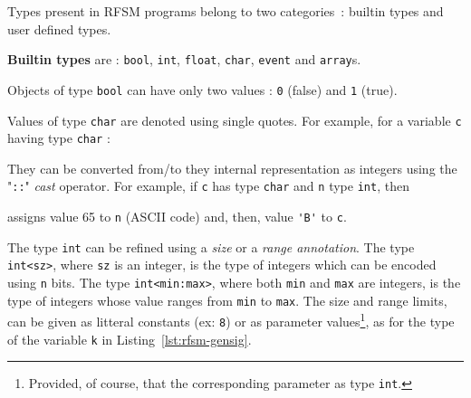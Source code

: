 Types present in RFSM programs belong to two categories~: builtin types and user defined types.

\medskip
\textbf{Builtin types} are : \texttt{bool}, \texttt{int}, \texttt{float}, \texttt{char}, \texttt{event} and
\texttt{array}s.

\step Objects of type \texttt{bool} can have only two values : \texttt{0} (false) and \texttt{1} (true).

\step Values of type \texttt{char} are
denoted using single quotes. For example, for a variable \verb|c| having type \verb|char| :
\begin{center}
\end{center}
They can be converted from/to they internal representation as integers using the "\verb|::|" \emph{cast}
operator. For example, if \verb|c| has type \verb|char| and \verb|n| type \verb|int|, then 
\begin{center}
\end{center}
assigns value 65 to \verb|n| (ASCII code) and, then, value \verb|'B'| to \verb|c|.


\step The type \texttt{int} can be refined using a \emph{size} or a \emph{range annotation}. The
type \verb|int<sz>|, where \verb|sz| is an integer, is the type of integers which can be encoded using
\verb|n| bits. The type \verb|int<min:max>|, where both \verb|min| and \verb|max| are integers, is
the type of integers whose value ranges from \verb|min| to \verb|max|. The size and range limits,
can be given as litteral constants (ex: \verb|8|) or as parameter values\footnote{Provided, of
  course, that the corresponding parameter as type \texttt{int}.}, as for the type of the
variable \texttt{k} in Listing~\ref{lst:rfsm-gensig}.

